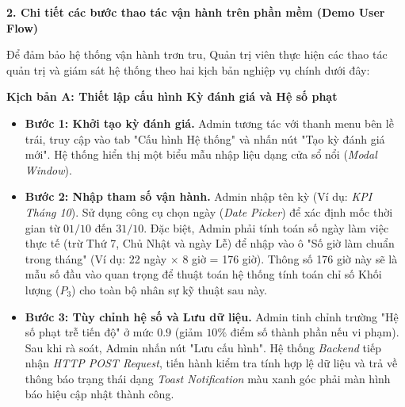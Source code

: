 \documentclass[a4paper,13.5pt]{extreport}
\begin{document}
\textbf{2. Chi tiết các bước thao tác vận hành trên phần mềm (Demo User Flow)}

Để đảm bảo hệ thống vận hành trơn tru, Quản trị viên thực hiện các thao tác quản trị và giám sát hệ thống theo hai kịch bản nghiệp vụ chính dưới đây:

\textbf{Kịch bản A: Thiết lập cấu hình Kỳ đánh giá và Hệ số phạt}
\begin{itemize}
    \item \textbf{Bước 1: Khởi tạo kỳ đánh giá.} Admin tương tác với thanh menu bên lề trái, truy cập vào tab "Cấu hình Hệ thống" và nhấn nút "Tạo kỳ đánh giá mới". Hệ thống hiển thị một biểu mẫu nhập liệu dạng cửa sổ nổi (\textit{Modal Window}).
    \item \textbf{Bước 2: Nhập tham số vận hành.} Admin nhập tên kỳ (Ví dụ: \textit{KPI Tháng 10}). Sử dụng công cụ chọn ngày (\textit{Date Picker}) để xác định mốc thời gian từ $01/10$ đến $31/10$. Đặc biệt, Admin phải tính toán số ngày làm việc thực tế (trừ Thứ 7, Chủ Nhật và ngày Lễ) để nhập vào ô "Số giờ làm chuẩn trong tháng" (Ví dụ: 22 ngày $\times$ 8 giờ = 176 giờ). Thông số 176 giờ này sẽ là mẫu số đầu vào quan trọng để thuật toán hệ thống tính toán chỉ số Khối lượng ($P_3$) cho toàn bộ nhân sự kỹ thuật sau này.
    \item \textbf{Bước 3: Tùy chỉnh hệ số và Lưu dữ liệu.} Admin tinh chỉnh trường "Hệ số phạt trễ tiến độ" ở mức $0.9$ (giảm $10\%$ điểm số thành phần nếu vi phạm). Sau khi rà soát, Admin nhấn nút "Lưu cấu hình". Hệ thống \textit{Backend} tiếp nhận \textit{HTTP POST Request}, tiến hành kiểm tra tính hợp lệ dữ liệu và trả về thông báo trạng thái dạng \textit{Toast Notification} màu xanh góc phải màn hình báo hiệu cập nhật thành công.
\end{itemize}
\end{document}
